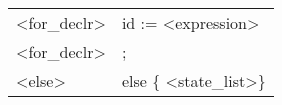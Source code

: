 \documentclass{article}
\begin{document}
\begin{table}[]
\begin{tabular}{l|l}
\textless{}for\_declr\textgreater{}     & id := \textless{}expression\textgreater{}                                                                                                            \\
\textless{}for\_declr\textgreater{}     & ;                                                                                                                                                    \\
\textless{}else\textgreater{}           & else \{ \textless{}state\_list\textgreater \}                                                                                           
\end{tabular}
\end{table}
\end{document}

